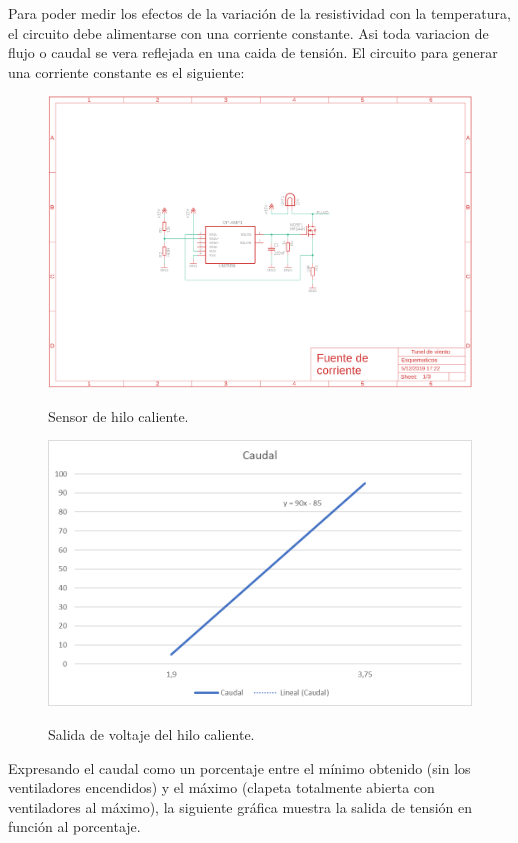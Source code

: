 \documentclass[12pt]{article}
\begin{document}
Para poder medir los efectos de la variación de la resistividad con la temperatura, el circuito debe alimentarse con una corriente constante. Asi toda variacion de flujo o caudal se vera reflejada en una caida de tensión. El circuito para generar una corriente constante es el siguiente:

\begin{figure}[H]
\centering
\includegraphics[scale=0.6]{src/imagenes/Fuente_de_corriente.png}
\label{fgr:Fuente_de_corriente}
\caption{Sensor de hilo caliente.}
\end{figure}

\begin{figure}[H]
\centering
\includegraphics[scale=0.6]{src/imagenes/Grafica_hilo_caliente.png}
\label{fgr:Grafica_hilo_caliente}
\caption{Salida de voltaje del hilo caliente.}
\end{figure}

Expresando el caudal como un porcentaje entre el mínimo obtenido (sin los ventiladores encendidos) y el máximo (clapeta totalmente abierta con ventiladores al máximo), la siguiente gráfica muestra la salida de tensión en función al porcentaje. \\
\end{document}

